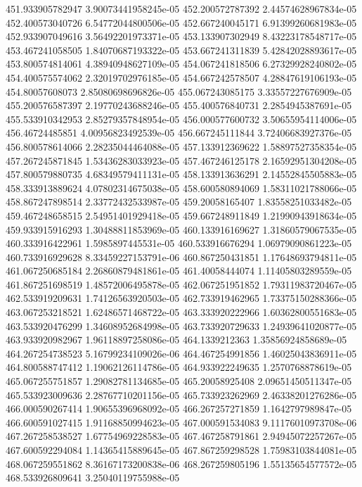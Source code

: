 {451.933905782947 3.90073441958245e-05
452.200572787392 2.44574628967834e-05
452.400573040726 6.54772044800506e-05
452.667240045171 6.91399260681983e-05
452.933907049616 3.56492201973371e-05
453.133907302949 8.43223178548717e-05
453.467241058505 1.84070687193322e-05
453.667241311839 5.42842028893617e-05
453.800574814061 4.38940948627109e-05
454.067241818506 6.27329928240802e-05
454.400575574062 2.32019702976185e-05
454.667242578507 4.28847619106193e-05
454.80057608073 2.85080698696826e-05
455.067243085175 3.33557227676909e-05
455.200576587397 2.19770243688246e-05
455.400576840731 2.2854945387691e-05
455.533910342953 2.85279357848954e-05
456.000577600732 3.50655954114006e-05
456.46724485851 4.00956823492539e-05
456.667245111844 3.72406683927376e-05
456.800578614066 2.28235044464088e-05
457.133912369622 1.58897527358354e-05
457.267245871845 1.53436283033923e-05
457.467246125178 2.16592951304208e-05
457.800579880735 4.68349579411131e-05
458.133913636291 2.14552845505883e-05
458.333913889624 4.07802314675038e-05
458.600580894069 1.58311021788066e-05
458.867247898514 2.33772432533987e-05
459.20058165407 1.83558251033482e-05
459.467248658515 2.54951401929418e-05
459.667248911849 1.21990943918634e-05
459.933915916293 1.30488811853969e-05
460.133916169627 1.31860579067535e-05
460.333916422961 1.5985897445531e-05
460.533916676294 1.06979090861223e-05
460.733916929628 8.33459227153791e-06
460.867250431851 1.17648693794811e-05
461.067250685184 2.26860879481861e-05
461.40058444074 1.11405803289559e-05
461.867251698519 1.48572006495878e-05
462.067251951852 1.79311983720467e-05
462.533919209631 1.74126563920503e-05
462.733919462965 1.73375150288366e-05
463.067253218521 1.62486571468722e-05
463.333920222966 1.60362800551683e-05
463.533920476299 1.34608952684998e-05
463.733920729633 1.24939641020877e-05
463.933920982967 1.96118897258086e-05
464.1339212363 1.35856924858689e-05
464.267254738523 5.16799234109026e-06
464.467254991856 1.46025043836911e-05
464.800588747412 1.19062126114786e-05
464.933922249635 1.2570768878619e-05
465.067255751857 1.29082781134685e-05
465.20058925408 2.09651450511347e-05
465.533923009636 2.28767710201156e-05
465.733923262969 2.46338201276286e-05
466.000590267414 1.90655396968092e-05
466.267257271859 1.1642797989847e-05
466.600591027415 1.91168850994623e-05
467.000591534083 9.11176010973708e-06
467.267258538527 1.67754969228583e-05
467.467258791861 2.94945072257267e-05
467.600592294084 1.14365415889645e-05
467.867259298528 1.75983103844081e-05
468.067259551862 8.36167173200838e-06
468.267259805196 1.55135654577572e-05
468.533926809641 3.25040119755988e-05
}
